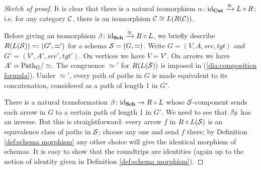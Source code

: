 \begin{proof}[Sketch of proof]

It is clear that there is a natural isomorphism $\alpha\colon\textnormal{id}_{\bf Cat}\xrightarrow{\cong} L\circ R$; i.e. for any category $\mathcal{C}$, there is an isomorphism $\mathcal{C}\cong L(R(\mathcal{C}))$. 

Before giving an isomorphism $\beta\colon\textnormal{id}_{\bf Sch}\xrightarrow{\cong}R\circ L$, we briefly describe $R(L(\mathcal{S}))=:(G',\simeq')$ for a schema $\mathcal{S}=(G,\simeq)$. Write $G=(V,A,src,tgt)$ and $G'=(V',A',src',tgt')$. On vertices we have $V=V'$. On arrows we have $A'=\textnormal{Path}_G/\simeq$. The congruence $\simeq'$ for $R(L(\mathcal{S}))$ is imposed in (\ref{dia:composition formula}). Under $\simeq'$, every path of paths in $G$ is made equivalent to its concatenation, considered as a path of length 1 in $G'$. 

There is a natural transformation $\beta\colon\textnormal{id}_{\bf Sch}\rightarrow R\circ L$ whose $\mathcal{S}$-component sends each arrow in $G$ to a certain path of length 1 in $G'$. We need to see that $\beta_\mathcal{S}$ has an inverse. But this is straightforward: every arrow $f$ in $R\circ L(\mathcal{S})$ is an  equivalence class of paths in $\mathcal{S}$; choose any one and send $f$ there; by Definition \ref{def:schema morphism} any other choice will give the identical morphism of schemas. It is easy to show that the roundtrips are identities (again up to the notion of identity given in Definition \ref{def:schema morphism}).

\end{proof}

